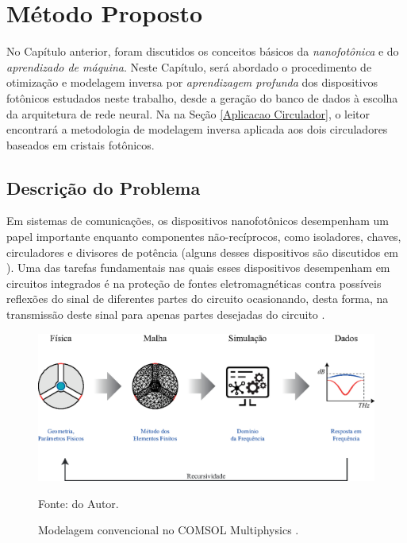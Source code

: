 \chapter{Método Proposto}      \label{Metodo Proposto}

No Capítulo anterior, foram discutidos os conceitos básicos da \textit{nanofotônica} e do \textit{aprendizado de máquina}. Neste Capítulo, será abordado o procedimento de otimização e modelagem inversa por \textit{aprendizagem profunda} dos dispositivos fotônicos estudados neste trabalho, desde a geração do banco de dados à escolha da arquitetura de rede neural. Na na Seção \ref{Aplicacao Circulador}, o leitor encontrará a metodologia de modelagem inversa aplicada aos dois circuladores baseados em cristais fotônicos.


\section{Descrição do Problema}

Em sistemas de comunicações, os dispositivos nanofotônicos desempenham um papel importante enquanto componentes não-recíprocos, como isoladores, chaves, circuladores e divisores de potência (alguns desses dispositivos são discutidos em \cite{dmitriev2012nonreciprocal,dmitriev2014magneto,dmitriev2019dynamically,dmitriev2013optical}). Uma das tarefas fundamentais nas quais esses dispositivos desempenham em circuitos integrados é na proteção de fontes eletromagnéticas contra possíveis reflexões do sinal de diferentes partes do circuito ocasionando, desta forma, na transmissão deste sinal para apenas partes desejadas do circuito \cite{hines1971reciprocal}.

\begin{figure}[H]
    \centering
    \includegraphics{04-Figuras/DirectModeling.eps}
    \caption{Modelagem convencional no COMSOL Multiphysics \textregistered.} \par
    Fonte: do Autor.
    \label{fig: DirectModeling}
\end{figure}

